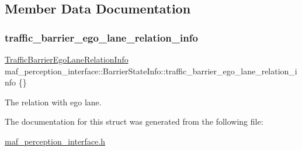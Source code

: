 \subsection{Member Data Documentation}
\mbox{\label{structmaf__perception__interface_1_1BarrierStateInfo_a47c852d60d9d8c30488aac69df95828b}} 
\subsubsection{\texorpdfstring{traffic\+\_\+barrier\+\_\+ego\+\_\+lane\+\_\+relation\+\_\+info}{traffic\_barrier\_ego\_lane\_relation\_info}}
{\footnotesize\ttfamily \hyperlink{structmaf__perception__interface_1_1TrafficBarrierEgoLaneRelationInfo}{Traffic\+Barrier\+Ego\+Lane\+Relation\+Info} maf\+\_\+perception\+\_\+interface\+::\+Barrier\+State\+Info\+::traffic\+\_\+barrier\+\_\+ego\+\_\+lane\+\_\+relation\+\_\+info \{\}}



The relation with ego lane. 



The documentation for this struct was generated from the following file\+:\begin{DoxyCompactItemize}
\item 
\hyperlink{maf__perception__interface_8h}{maf\+\_\+perception\+\_\+interface.\+h}\end{DoxyCompactItemize}
